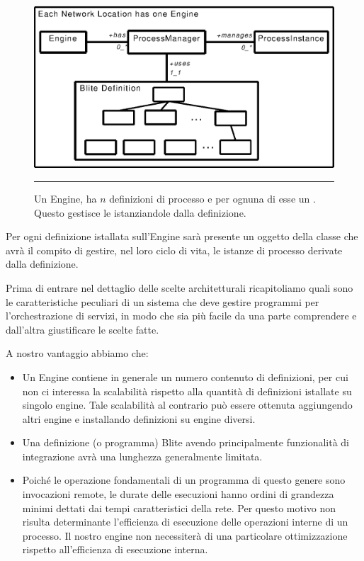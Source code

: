 \begin{figure}[!htp]
\begin{center}
  \includegraphics{architettura_interna/dia/engine}
  \caption[Blite-se: Engine, ProcessManager e ProcessInstace]{
  	Un Engine, ha $n$ definizioni di processo e per ognuna di esse un
  	. Questo gestisce le 
  	istanziandole dalla definizione.}
   \rule{7cm}{0.01cm}
  \label{fig:1}
\end{center}
\end{figure}

Per ogni definizione istallata sull'Engine sarà presente un oggetto 
della classe  che avrà il compito di gestire, nel loro
ciclo di vita, le istanze di processo derivate dalla definizione.

Prima di entrare nel dettaglio delle scelte architetturali ricapitoliamo quali
sono le caratteristiche peculiari di un sistema che deve gestire programmi per
l'orchestrazione di servizi, in modo che sia pi\`u facile da una parte
comprendere e dall'altra giustificare le scelte fatte.

A nostro vantaggio abbiamo che: \nopagebreak
\begin{itemize}
  \item Un Engine contiene in generale un numero contenuto di definizioni, per
  cui non ci interessa la scalabilità rispetto alla quantità di definizioni
  istallate su singolo engine. Tale scalabilità al contrario può essere
  ottenuta aggiungendo altri engine e installando definizioni su engine diversi.
  
  \item  Una definizione (o programma) Blite avendo principalmente funzionalità
  di integrazione avrà una lunghezza generalmente limitata. 
  
  \item Poiché le operazione fondamentali di un programma di questo genere
  sono invocazioni remote, le durate delle esecuzioni hanno ordini di grandezza
  minimi dettati dai tempi caratteristici della rete. Per questo motivo non
  risulta determinante l'efficienza di esecuzione delle operazioni interne di un
  processo. Il nostro engine non necessiterà di una particolare ottimizzazione 
  rispetto all'efficienza di esecuzione interna.
\end{itemize}


